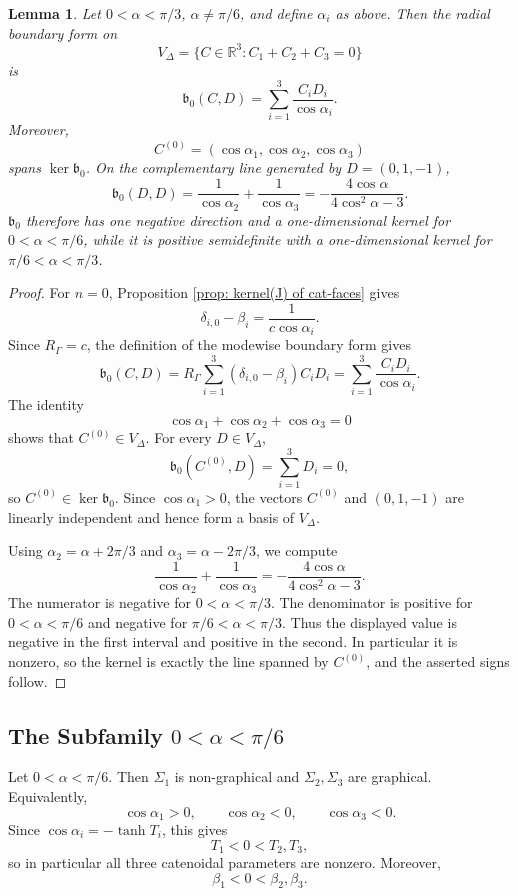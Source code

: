 \documentclass[11pt,twoside]{amsart}
\newtheorem{lem}[thm]{Lemma}
\numberwithin{equation}{section}
\begin{document}
\begin{lem}\label{lem: radial boundary sign}
Let $0<\alpha<\pi/3$, $\alpha\neq\pi/6$, and define $\alpha_i$ as above. Then the radial boundary form on
\[
V_\Delta=\{C\in\mathbb R^3:C_1+C_2+C_3=0\}
\]
is
\[
\mathfrak b_0(C,D)=\sum_{i=1}^3\frac{C_iD_i}{\cos\alpha_i}.
\]
Moreover,
\[
C^{(0)}=(\cos\alpha_1,\cos\alpha_2,\cos\alpha_3)
\]
spans $\ker\mathfrak b_0$. On the complementary line generated by $D=(0,1,-1)$,
\[
\mathfrak b_0(D,D)
=\frac1{\cos\alpha_2}+\frac1{\cos\alpha_3}
=-\frac{4\cos\alpha}{4\cos^2\alpha-3}.
\]
$\mathfrak b_0$ therefore has one negative direction and a one-dimensional kernel for $0<\alpha<\pi/6$, while it is positive semidefinite with a one-dimensional kernel for $\pi/6<\alpha<\pi/3$.
\end{lem}
\begin{proof}
For $n=0$, Proposition \ref{prop: kernel(J) of cat-faces} gives
\[
\delta_{i,0}-\beta_i=\frac{1}{c\cos\alpha_i}.
\]
Since $R_\Gamma=c$, the definition of the modewise boundary form gives
\[
\mathfrak b_0(C,D)
=R_\Gamma\sum_{i=1}^3(\delta_{i,0}-\beta_i)C_iD_i
=\sum_{i=1}^3\frac{C_iD_i}{\cos\alpha_i}.
\]
The identity
\[
\cos\alpha_1+\cos\alpha_2+\cos\alpha_3=0
\]
shows that $C^{(0)}\in V_\Delta$. For every $D\in V_\Delta$,
\[
\mathfrak b_0(C^{(0)},D)=\sum_{i=1}^3D_i=0,
\]
so $C^{(0)}\in\ker\mathfrak b_0$. Since $\cos\alpha_1>0$, the vectors $C^{(0)}$ and $(0,1,-1)$ are linearly independent and hence form a basis of $V_\Delta$.

Using $\alpha_2=\alpha+2\pi/3$ and $\alpha_3=\alpha-2\pi/3$, we compute
\[
\frac1{\cos\alpha_2}+\frac1{\cos\alpha_3}
=-\frac{4\cos\alpha}{4\cos^2\alpha-3}.
\]
The numerator is negative for $0<\alpha<\pi/3$. The denominator is positive for $0<\alpha<\pi/6$ and negative for $\pi/6<\alpha<\pi/3$. Thus the displayed value is negative in the first interval and positive in the second. In particular it is nonzero, so the kernel is exactly the line spanned by $C^{(0)}$, and the asserted signs follow.
\end{proof}


\subsection{The Subfamily \texorpdfstring{$0<\alpha<\pi/6$}{0 < alpha < pi/6}}

Let $0<\alpha<\pi/6$. Then $\Sigma_1$ is non-graphical and $\Sigma_2,\Sigma_3$ are graphical. Equivalently,
\[
\cos\alpha_1>0,\qquad \cos\alpha_2<0,\qquad \cos\alpha_3<0.
\]
Since $\cos\alpha_i=-\tanh T_i$, this gives
\[
T_1<0<T_2,T_3,
\]
so in particular all three catenoidal parameters are nonzero. Moreover,
\[
\beta_1<0<\beta_2,\beta_3.
\]
\end{document}
